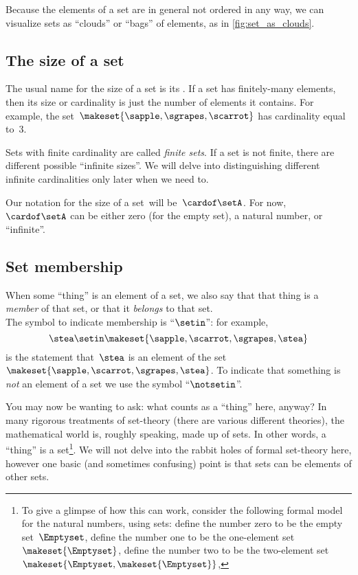 Because the elements of a set are in general not ordered in any way, we can visualize sets as ``clouds'' or ``bags'' of elements, as in \cref{fig:set_as_clouds}.

\subsection{The size of a set}
\label{sec:cardinality}
The usual name for the size of a set is its .
If a set has finitely-many elements, then its size or cardinality is just the number of elements it contains.
For example, the set~$\makeset{ \sapple, \sgrapes, \scarrot }$ has cardinality equal to~$3$.

Sets with finite cardinality are called \emph{finite sets}.
If a set is not finite, there are different possible ``infinite sizes''.
We will delve into distinguishing different infinite cardinalities only later when we need to.

Our notation for the size of a set~\setA will be~$\cardof\setA$.
For now,~$\cardof\setA$ can be either zero (for the empty set), a natural number, or ``infinite''.

\subsection{Set membership}
\label{sec:set-membership}
When some ``thing'' is an element of a set, we also say that that thing is a \emph{member} of that set, or that it \emph{belongs} to that set.
\\The symbol to indicate membership is ``$\setin$'': for example,
\begin{equation}
    \stea \setin\makeset{ \sapple, \scarrot, \sgrapes, \stea }
\end{equation}
is the statement that~$\stea$ is an element of the set~$\makeset{ \sapple, \scarrot, \sgrapes, \stea }$.
To indicate that something is \emph{not} an element of a set we use the symbol ``$\notsetin$''.

You may now be wanting to ask: what counts as a ``thing'' here, anyway?
In many rigorous treatments of set-theory (there are various different theories), the mathematical world is, roughly speaking, made up of sets.
In other words, a ``thing'' is a set\footnote{
    To give a glimpse of how this can work, consider the following formal model for the natural numbers, using sets: define the number zero to be the empty set~$\Emptyset$, define the number one to be the one-element set~$\makeset{ \Emptyset }$, define the number two to be the two-element set~$\makeset{ \Emptyset, \makeset{ \Emptyset } }$, \etc }.
We will not delve into the rabbit holes of formal set-theory here, however one basic (and sometimes confusing) point is that sets can be elements of other sets.

